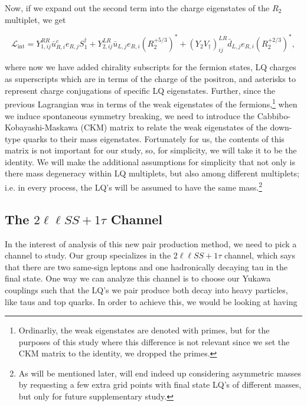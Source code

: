         Now, if we expand out the second term into the charge eigenstates of the $R_2$ multiplet, we get

        \begin{equation}
            \mathcal{L}_{\text{int}} = Y_{1,ij}^{RR} \bar{u}^c_{R,i} e_{R,j} S_1^{\dagger} + Y_{2,ij}^{LR} \bar{u}_{L,j} e_{R,i}  (R_2^{+5/3})^* + (Y_2 V_{\dagger})_{ij}^{LR}\bar{d}_{L,j} e_{R,i}  (R_2^{+2/3})^*,
        \end{equation}

        where now we have added chirality subscripts for the fermion states, LQ charges as superscripts which are in terms of the charge of the positron, and asterisks to represent charge conjugations of specific LQ eigenstates. Further, since the previous Lagrangian was in terms of the weak eigenstates of the fermions,\footnote{Ordinarliy, the weak eigenstates are denoted with primes, but for the purposes of this study where this difference is not relevant since we set the CKM matrix to the identity, we dropped the primes.} when we induce spontaneous symmetry breaking, we need to introduce the Cabbibo-Kobayashi-Maskawa (CKM) matrix to relate the weak eigenstates of the down-type quarks to their mass eigenstates. Fortunately for us, the contents of this matrix is not important for our study, so, for simplicity, we will take it to be the identity. We will make the additional assumptions for simplicity that not only is there mass degeneracy within LQ multiplets, but also among different multiplets; i.e. in every process, the LQ's will be assumed to have the same mass.\footnote{As will be mentioned later, will end indeed up considering asymmetric masses by requesting a few extra grid points with final state LQ's of different masses, but only for future supplementary study.}



    \subsection{The \texorpdfstring{$2\ell\ell SS+1\tau$}{2llSS+1tau} Channel}
        In the interest of analysis of this new pair production method, we need to pick a channel to study. Our group specializes in the $2\ell\ell SS+1\tau$ channel, which says that there are two same-sign leptons and one hadronically decaying tau in the final state. One way we can analyze this channel is to choose our Yukawa couplings such that the LQ's we pair produce both decay into heavy particles, like taus and top quarks. In order to achieve this, we would be looking at having
        
